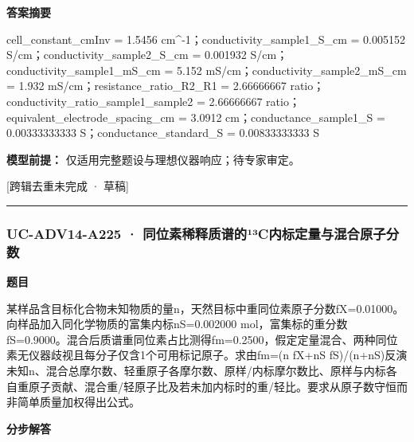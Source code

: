\documentclass[UTF8,11pt,a4paper]{ctexart}
\begin{document}
\noindent\textbf{答案摘要}\par
cell\_constant\_cmInv = 1.5456 cm\textasciicircum{}-1；conductivity\_sample1\_S\_cm = 0.005152 S/cm；conductivity\_sample2\_S\_cm = 0.001932 S/cm；conductivity\_sample1\_mS\_cm = 5.152 mS/cm；conductivity\_sample2\_mS\_cm = 1.932 mS/cm；resistance\_ratio\_R2\_R1 = 2.66666667 ratio；conductivity\_ratio\_sample1\_sample2 = 2.66666667 ratio；equivalent\_electrode\_spacing\_cm = 3.0912 cm；conductance\_sample1\_S = 0.00333333333 S；conductance\_standard\_S = 0.00833333333 S\par
\noindent\textbf{模型前提：}
仅适用完整题设与理想仪器响应；待专家审定。\par
\noindent\textcolor{red!65!black}{[跨辑去重未完成 · 草稿]} \par
\medskip\hrule\medskip
{}
\subsubsection*{UC-ADV14-A225 · 同位素稀释质谱的¹³C内标定量与混合原子分数}
\noindent\textbf{题目}\par
某样品含目标化合物未知物质的量n，天然目标中重同位素原子分数fX=0.01000。向样品加入同化学物质的富集内标nS=0.002000 mol，富集标的重分数fS=0.9000。混合后质谱重同位素占比测得fm=0.2500，假定定量混合、两种同位素无仪器歧视且每分子仅含1个可用标记原子。求由fm=(n fX+nS fS)/(n+nS)反演未知n、混合总摩尔数、轻重原子各摩尔数、原样/内标摩尔数比、原样与内标各自重原子贡献、混合重/轻原子比及若未加内标时的重/轻比。要求从原子数守恒而非简单质量加权得出公式。\par
\medskip\noindent\textbf{分步解答}
\end{document}
